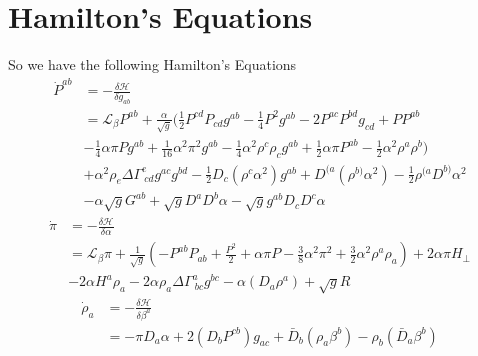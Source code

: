 \documentclass{article}
\begin{document}
\section{Hamilton's Equations}
So we have the following Hamilton's Equations
\begin{align*}
{\dot P}^{ab} &= -\frac{\delta \mathcal{H}}{\delta g_{ab}} \\ &
= \mathcal{L}_{\beta}P^{ab} + \frac{\alpha}{\sqrt{g}}(\frac{1}{2}P^{cd}P_{cd}g^{ab} - \frac{1}{4}P^{2}g^{ab} - 2P^{ac}P^{bd}g_{cd} + PP^{ab} \\
&-\frac{1}{4}\alpha \pi P g^{ab} + \frac{1}{16}\alpha^2 \pi^2 g^{ab} - \frac{1}{4}\alpha^2 \rho^{c}\rho_{c}g^{ab} + \frac{1}{2}\alpha \pi P^{ab} - \frac{1}{2}\alpha^2\rho^{a}\rho^{b}) \\
&+ \alpha^2 \rho_{e}\Delta \Gamma^{e}_{~cd}g^{ac}g^{bd} - \frac{1}{2}D_{c}(\rho^{c} \alpha^2)g^{ab} + D^{(a}(\rho^{b)} \alpha^2) - \frac{1}{2}\rho^{(a}D^{b)}\alpha^2\\
& - \alpha \sqrt{g}G^{ab} + \sqrt{g} D^{a}D^{b}\alpha - \sqrt{g}g^{ab}D_{c}D^{c} \alpha
\end{align*}
\begin{align*}
{\dot \pi} & = - \frac{\delta \mathcal{H}}{\delta \alpha} \\
& = \mathcal{L}_{\beta} \pi + \frac{1}{\sqrt{g}}(-P^{ab}P_{ab} + \frac{P^2}{2} + \alpha \pi P - \frac{3}{8}\alpha^2 \pi^2 + \frac{3}{2}\alpha^2 \rho^{a}\rho_{a}) + 2\alpha \pi H_{\perp} \\
& - 2 \alpha H^{a}\rho_{a} - 2\alpha \rho_{a} \Delta \Gamma^{a}_{~bc}g^{bc} - \alpha (D_{a}\rho^{a}) + \sqrt{g}R
\end{align*}
\begin{align*}
{\dot \rho}_{a} &= -\frac{\delta \mathcal{H}}{\delta \beta^{a}}\\
& = -\pi D_{a} \alpha + 2(D_{b}P^{cb})g_{ac} + {\bar D}_{b}(\rho_{a}\beta^{b}) - \rho_{b}({\bar D}_{a}\beta^{b})
\end{align*}
\end{document}
